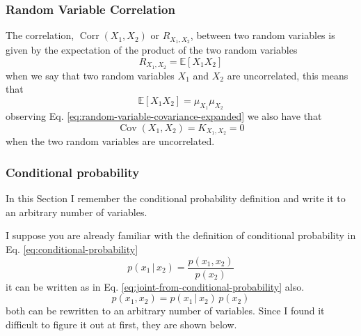 \documentclass[12pt]{article}
\newcommand{\given}{\,|\,} %
\newcommand{\brac}[1]{\left[#1\right]} %
\newcommand{\parentheses}[1]{\left(#1\right)}
\newcommand{\cov}[1]{\mathop{Cov}\parentheses{#1}}
\newcommand{\expv}[1]{\mathbb{E}\brac{#1}} %
\begin{document}
\subsubsection{Random Variable Correlation} 
The correlation, $\mathop{Corr}(X_1, X_2)$ or $R_{X_1, X_2}$, between two random variables is given by the expectation of the product of the two random variables
\begin{equation}
    R_{X_1, X_2} = \expv{X_1 X_2} 
    \label{eq:correlation}
\end{equation}
when we say that two random variables $X_1$ and $X_2$ are uncorrelated, this means that
\begin{equation*}
    \expv{X_1 X_2} = \mu_{X_1} \mu_{X_2}
\end{equation*}
observing Eq. \ref{eq:random-variable-covariance-expanded} we also have that
\begin{equation*}
    \cov{X_1, X_2} = K_{X_1, X_2} = 0
\end{equation*}
when the two random variables are uncorrelated.

\subsubsection{Conditional probability}
In this Section I remember the conditional probability definition and write it to an arbitrary number of variables.

I suppose you are already familiar with the definition of conditional probability in Eq. \ref{eq:conditional-probability}
\begin{equation}
    p(x_1 \given x_2) = \dfrac{p(x_1, x_2)}{p(x_2)}    
    \label{eq:conditional-probability}
\end{equation}
it can be written as in Eq. \ref{eq:joint-from-conditional-probability} also.
\begin{equation}
    p(x_1, x_2) = p(x_1 \given x_2) \, p(x_2)
    \label{eq:joint-from-conditional-probability}
\end{equation}
both can be rewritten to an arbitrary number of variables. Since I found it difficult to figure it out at first, they are shown below.
\end{document}
